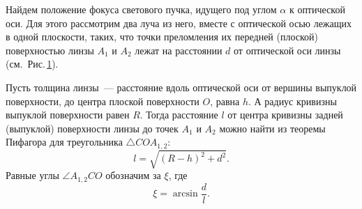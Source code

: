 \begin{figure}[h]
	\caption{}
	\label{pic:optical-aberrations-coma1}
\end{figure}

Найдем положение фокуса светового пучка, идущего под углом $\alpha$ к оптической оси. Для этого рассмотрим два луча из него, вместе с оптической осью лежащих в одной плоскости, таких, что точки преломления их передней (плоской) поверхностью линзы $A_1$ и $A_2$ лежат на расстоянии $d$ от оптической оси линзы (см.~Рис.\,\ref{pic:optical-aberrations-coma1}).

Пусть толщина линзы~--- расстояние вдоль оптической оси от вершины выпуклой поверхности, до центра плоской поверхности $O$, равна $h$. А радиус кривизны выпуклой поверхности равен $R$. Тогда расстояние $l$ от центра кривизны задней (выпуклой) поверхности линзы до точек $A_1$ и $A_2$ можно найти из теоремы Пифагора для треугольника $\triangle COA_{1,2}$:
\begin{equation*}
	l = \sqrt{(R - h)^2 + d^2}.
\end{equation*}
Равные углы $\angle A_{1,2} C O$ обозначим за $\xi$, где
\begin{equation*}
	\xi = \arcsin \frac{d}{l}.
\end{equation*}

